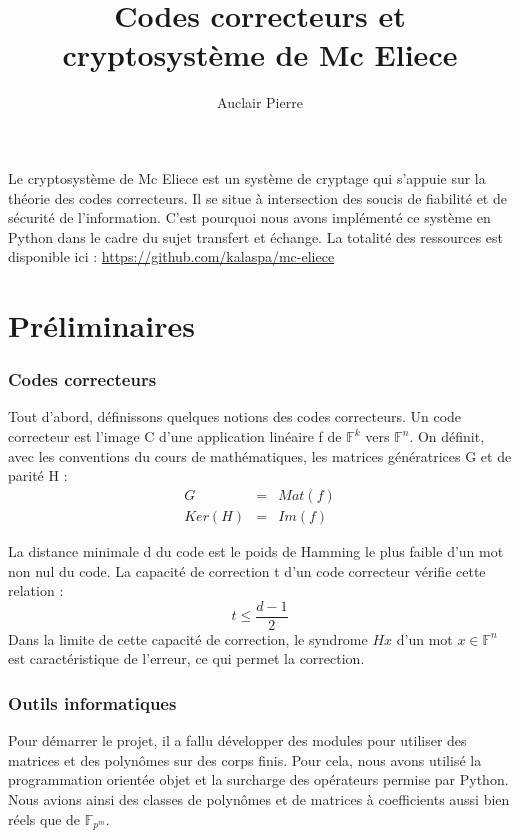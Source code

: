 \documentclass{article}
\title{Codes correcteurs et cryptosystème de Mc Eliece}
\author{Auclair Pierre}
\begin{document}
	\maketitle

	Le cryptosystème de Mc Eliece est un système de cryptage qui s'appuie sur la théorie des codes correcteurs.
	Il se situe à intersection des soucis de fiabilité et de sécurité de l'information.
	C'est pourquoi nous avons implémenté ce système en Python dans le cadre du sujet transfert et échange.
	La totalité des ressources est disponible ici : \url{https://github.com/kalaspa/mc-eliece}


	\part*{Préliminaires}

		\section*{Codes correcteurs}
			\cite{04cc}
			Tout d'abord, définissons quelques notions des codes correcteurs.
			Un code correcteur est l'image C d'une application linéaire f de $\mathbb{F}^{k}$ vers $\mathbb{F}^{n}$.
			On définit, avec les conventions du cours de mathématiques, les matrices génératrices G et de parité H :
			\begin{eqnarray*}
				G &=& Mat(f) \\
				Ker(H) &=& Im(f)
			\end{eqnarray*}

			La distance minimale d du code est le poids de Hamming le plus faible d'un mot non nul du code.
			La capacité de correction t d'un code correcteur vérifie cette relation :
			$$
				t \leq \frac{d-1}{2}
			$$
			Dans la limite de cette capacité de correction, le syndrome $Hx$ d'un mot $x \in \mathbb{F}^{n}$ est caractéristique de l'erreur, ce qui permet la correction.

		\section*{Outils informatiques}
			Pour démarrer le projet, il a fallu développer des modules pour utiliser des matrices et des polynômes sur des corps finis.
			Pour cela, nous avons utilisé la programmation orientée objet et la surcharge des opérateurs permise par Python.
			Nous avions ainsi des classes de polynômes et de matrices à coefficients aussi bien réels que de $\mathbb{F}_{p^{m}}$.
\end{document}

